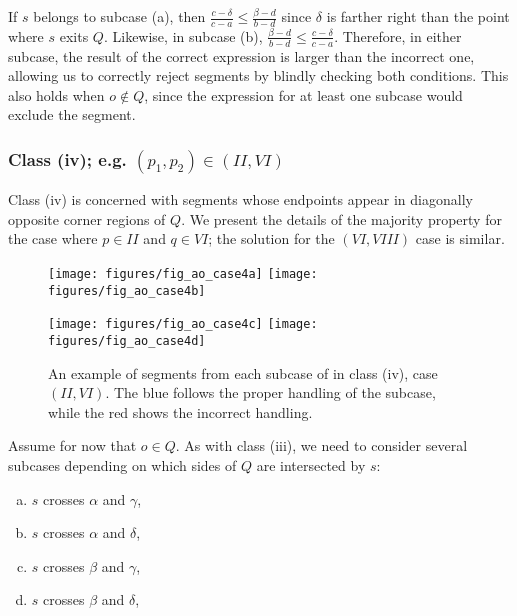 If $s$ belongs to subcase (a), then $\frac{c - \delta}{c - a} \leq \frac{\beta - d}{b - d}$ since $\delta$ is farther right than the point where $s$ exits $Q$. Likewise, in subcase (b), $\frac{\beta - d}{b - d} \leq \frac{c - \delta}{c - a}$.  Therefore, in either subcase, the result of the correct expression is larger than the incorrect one, allowing us to correctly reject segments by blindly checking both conditions.  This also holds when $o \not \in Q$, since the expression for at least one subcase would exclude the segment.


\subsubsection*{Class (iv); e.g. $(p_1, p_2) \in (II, VI)$}
\label{:rectanges:ao:class4}

Class (iv) is concerned with segments whose endpoints appear in diagonally opposite corner regions of $Q$. We present the details of the majority property for the case where $p \in II$ and $q \in VI$; the solution for the $(VI, VIII)$ case is similar.

\begin{figure}[t]
\begin{center}
  \texttt{[image: figures/fig\_ao\_case4a]}
  \hspace{1.0em}
  \texttt{[image: figures/fig\_ao\_case4b]}

  \vspace{2.0em}
  
  \texttt{[image: figures/fig\_ao\_case4c]}
  \hspace{1.0em}
  \texttt{[image: figures/fig\_ao\_case4d]}

  \caption[An example of a segment in class (iv), case $(II, VI)$.]{An example of segments from each subcase of in class (iv), case $(II, VI)$. The blue follows the proper handling of the subcase, while the red shows the incorrect handling.}
  \label{fig:rectangles:ao:case4}
\end{center}
\end{figure}

Assume for now that $o \in Q$. As with class (iii), we need to consider several subcases depending on which sides of $Q$ are intersected by $s$:

\begin{enumerate}[(a)]
\item $s$ crosses $\alpha$ and $\gamma$,
\item $s$ crosses $\alpha$ and $\delta$,
\item $s$ crosses $\beta$ and $\gamma$,
\item $s$ crosses $\beta$ and $\delta$,
\end{enumerate}

